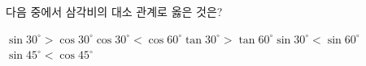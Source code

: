 다음 중에서 삼각비의 대소 관계로 옳은 것은?
\begin{choicesii}{$\sin 30^\circ>\cos 30^\circ$}{$\cos 30^\circ<\cos 60^\circ$}{$\tan 30^\circ>\tan 60^\circ$}{$\sin 30^\circ<\sin 60^\circ$}{$\sin 45^\circ<\cos 45^\circ$}\end{choicesii}
